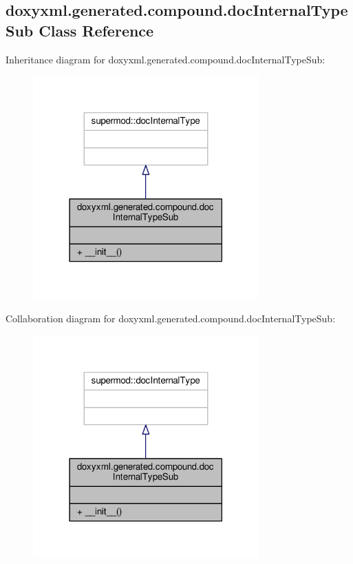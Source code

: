 \subsection{doxyxml.\+generated.\+compound.\+doc\+Internal\+Type\+Sub Class Reference}
\label{classdoxyxml_1_1generated_1_1compound_1_1docInternalTypeSub}


Inheritance diagram for doxyxml.\+generated.\+compound.\+doc\+Internal\+Type\+Sub\+:
\nopagebreak
\begin{figure}[H]
\begin{center}
\leavevmode
\includegraphics[width=246pt]{d2/d3b/classdoxyxml_1_1generated_1_1compound_1_1docInternalTypeSub__inherit__graph}
\end{center}
\end{figure}


Collaboration diagram for doxyxml.\+generated.\+compound.\+doc\+Internal\+Type\+Sub\+:
\nopagebreak
\begin{figure}[H]
\begin{center}
\leavevmode
\includegraphics[width=246pt]{d9/d6d/classdoxyxml_1_1generated_1_1compound_1_1docInternalTypeSub__coll__graph}
\end{center}
\end{figure}
